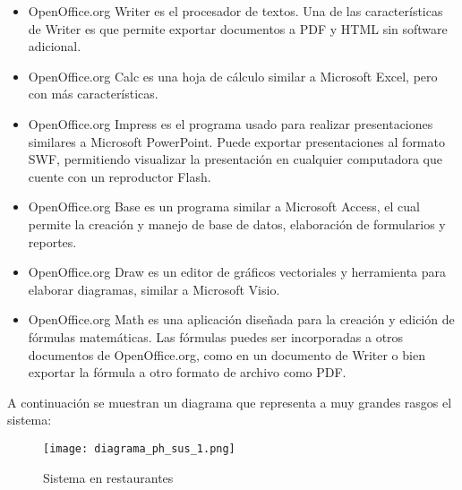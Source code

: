 \begin{itemize}
 \item OpenOffice.org Writer es el procesador de textos. Una de las características de Writer es que permite exportar documentos a PDF y HTML sin software adicional.
 \item OpenOffice.org Calc es una hoja de cálculo similar a Microsoft Excel, pero con más características.
 \item OpenOffice.org Impress es el programa usado para realizar presentaciones similares a Microsoft PowerPoint. Puede exportar presentaciones al formato SWF, permitiendo visualizar la presentación en cualquier computadora que cuente con un reproductor Flash.
 \item OpenOffice.org Base es un programa similar a Microsoft Access, el cual permite la creación y manejo de base de datos, elaboración de formularios y reportes.
 \item OpenOffice.org Draw es un editor de gráficos vectoriales y herramienta para elaborar diagramas, similar a Microsoft Visio.
 \item OpenOffice.org Math es una aplicación diseñada para la creación y edición de fórmulas matemáticas. Las fórmulas puedes ser incorporadas a otros documentos de OpenOffice.org, como en un documento de Writer o bien exportar la fórmula a otro formato de archivo como PDF.
\end{itemize}


A continuación se muestran un diagrama que representa a muy grandes rasgos el sistema:

\begin{figure}[htb]
 \begin{center}
  \leavemode
  \texttt{[image: diagrama\_ph\_sus\_1.png]}
 \end{center}
 \caption{Sistema en restaurantes}
 \label{fig:sist_rest}
\end{figure}


